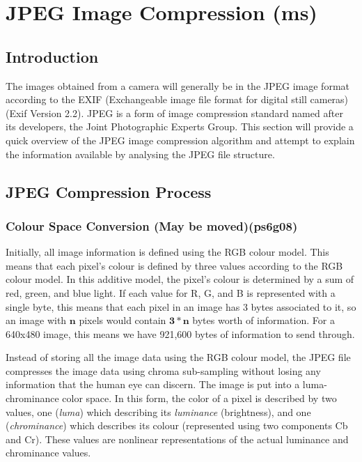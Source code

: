 
\section{JPEG Image Compression (ms)}
\label{jpeg_image_compression}
\subsection{Introduction}
The images obtained from a camera will generally be in the JPEG image format
according to the 
EXIF (Exchangeable image file format for digital still cameras)
 (Exif Version 2.2).\cite{exif_std} 
JPEG is a form of image compression standard named after its developers, 
the Joint Photographic Experts Group. \cite{winzip_jpeg_compression}
This section will provide a quick overview of the JPEG image compression algorithm
and attempt to explain the information available by
analysing the JPEG file structure.

\subsection{JPEG Compression Process}

\subsubsection{Colour Space Conversion (May be moved)(ps6g08)}
\label{sec:colour_space_conversion}
Initially, all image information is defined using the RGB colour model.
This means that each pixel's colour is defined by three values according to the RGB colour model. 
In this additive model, the pixel's colour is determined by a sum of red, green, and blue light. 
If each value for R, G, and B is represented with a single byte, 
this means that each pixel in an image has 3 bytes associated to it, so 
an image with $\mathbf{n}$ pixels would contain $\mathbf{3*n}$ bytes worth of information. 
For a 640x480 image, this means we have 921,600 bytes of information to send through.

Instead of storing all the image data using the RGB colour model, 
the JPEG file compresses the image data using chroma sub-sampling 
without losing any information that the human eye can discern. 
The image is put into  a luma-chrominance color space. In this form, the color of a pixel is described by two values, 
one (\emph{luma}) which describing its \emph{luminance} (brightness), and 
one (\emph{chrominance}) which describes its colour 
(represented using two components Cb and Cr).
These values are nonlinear representations
of the actual luminance and chrominance values.\cite{kerr_chroma_subsampling}

